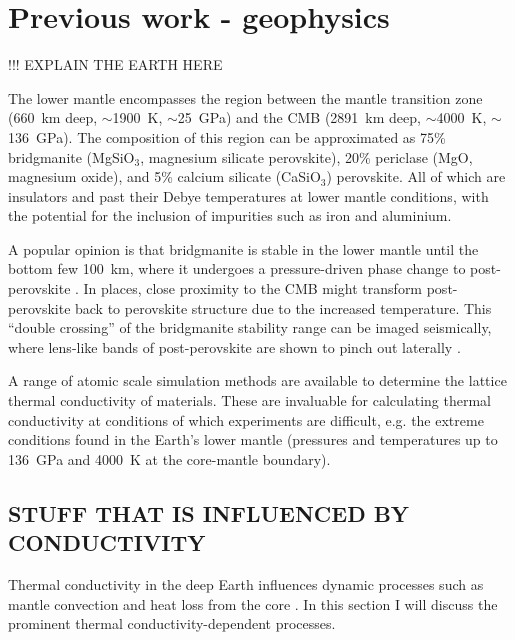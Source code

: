 \section{Previous work - geophysics}

!!! EXPLAIN THE EARTH HERE

The lower mantle encompasses the region between the mantle transition zone (660~km deep, $\sim$1900~K, $\sim$25~GPa) and the CMB (2891~km deep, $\sim$4000~K, $\sim$136~GPa). The composition of this region can be approximated as 75\% bridgmanite (MgSiO$_3$, magnesium silicate perovskite), 20\% periclase (MgO, magnesium oxide), and  5\% calcium silicate (CaSiO$_3$) perovskite. All of which are insulators and past their Debye temperatures at lower mantle conditions, with the potential for the inclusion of impurities such as iron and aluminium.

A popular opinion is that bridgmanite is stable in the lower mantle until the bottom few 100~km, where it undergoes a pressure-driven phase change to post-perovskite \citep{Murakami2004,Oganov2004}. In places, close proximity to the CMB might transform post-perovskite back to perovskite structure due to the increased temperature. This ``double crossing'' of the bridgmanite stability range can be imaged seismically, where lens-like bands of post-perovskite are shown to pinch out laterally \citep{Lay2006}.

A range of atomic scale simulation methods are available to determine the lattice thermal conductivity of materials. These are invaluable for calculating thermal conductivity at conditions of which experiments are difficult, e.g. the extreme conditions found in the Earth's lower mantle (pressures and temperatures up to 136~GPa and 4000~K at the core-mantle boundary). 

\subsection{STUFF THAT IS INFLUENCED BY CONDUCTIVITY}
\label{sec:ch1:cond_in_earth}

Thermal conductivity in the deep Earth influences dynamic processes such as mantle convection and heat loss from the core \citep{Lay2008}. In this section I will discuss the prominent thermal conductivity-dependent processes.

